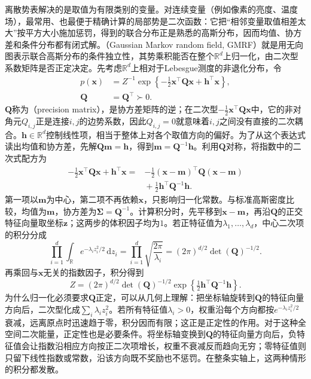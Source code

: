 离散势表解决的是取值为有限类别的变量。对连续变量（例如像素的亮度、温度场），最常用、也最便于精确计算的局部势是二次函数：它把“相邻变量取值相差太大”按平方大小施加惩罚，得到的联合分布正是熟悉的高斯分布，因而均值、协方差和条件分布都有闭式解。（Gaussian Markov random field, GMRF）就是用无向图表示联合高斯分布的条件独立性，其势乘积能否在整个$\mathbb{R}^d$上归一化，由二次型系数矩阵是否正定决定。先考虑$\mathbb{R}^d$上相对于Lebesgue测度的非退化分布，令
\begin{equation}
  \begin{aligned}
    p(\bm{x})&=Z^{-1}
      \exp\left\{-\tfrac12\bm{x}^{\top}\bm{Q}\bm{x}
                   +\bm{h}^{\top}\bm{x}\right\},\\
    \bm{Q}&=\bm{Q}^{\top}\succ0.
  \end{aligned}
  \label{eq:pgm-undirected-gaussian}
\end{equation}
$\bm{Q}$称为（precision matrix），是协方差矩阵的逆；在二次型$-\tfrac12\bm{x}^{\top}\bm{Q}\bm{x}$中，它的非对角元$Q_{i,j}$正是连接$i,j$的边势系数，因此$Q_{i,j}=0$就意味着$i,j$之间没有直接的二次耦合。$\bm{h}\in\mathbb{R}^d$控制线性项，相当于整体上对各个取值方向的偏好。为了从这个表达式读出均值和协方差，先解$\bm{Q}\bm{m}=\bm{h}$，得到$\bm{m}=\bm{Q}^{-1}\bm{h}$。利用$\bm{Q}$对称，将指数中的二次式配方为
\[
  \begin{aligned}
    -\tfrac12\bm{x}^{\top}\bm{Q}\bm{x}
      +\bm{h}^{\top}\bm{x}
    ={}&-\tfrac12(\bm{x}-\bm{m})^{\top}
               \bm{Q}(\bm{x}-\bm{m})\\
       &{}+\tfrac12\bm{h}^{\top}\bm{Q}^{-1}\bm{h}.
  \end{aligned}
\]
第一项以$\bm{m}$为中心，第二项不再依赖$\bm{x}$，只影响归一化常数。与标准高斯密度比较，均值为$\bm{m}$，协方差为$\bm{\Sigma}=\bm{Q}^{-1}$。计算积分时，先平移到$\bm{x}-\bm{m}$，再沿$\bm{Q}$的正交特征向量取坐标$\bm{z}$；这两步的体积因子均为$1$。若正特征值为$\lambda_1,\ldots,\lambda_d$，中心二次项的积分分成
\[
  \prod_{i=1}^d\int_{\mathbb{R}}
       e^{-\lambda_i z_i^2/2}\,\mathrm{d}z_i
  =\prod_{i=1}^d\sqrt{\frac{2\pi}{\lambda_i}}
  =(2\pi)^{d/2}\det(\bm{Q})^{-1/2}.
\]
再乘回与$\bm{x}$无关的指数因子，积分得到
\begin{equation}
  Z=(2\pi)^{d/2}\det(\bm{Q})^{-1/2}
     \exp\left\{\tfrac12\bm{h}^{\top}\bm{Q}^{-1}\bm{h}\right\}.
  \label{eq:pgm-undirected-gaussian-partition}
\end{equation}
为什么归一化必须要求$\bm{Q}$正定，可以从几何上理解：把坐标轴旋转到$\bm{Q}$的特征向量方向后，二次型化成$\sum_i\lambda_i z_i^2$。若所有特征值$\lambda_i>0$，权重沿每个方向都按$e^{-\lambda_i z_i^2/2}$衰减，远离原点时迅速趋于零，积分因而有限；这正是正定性的作用。对于这种全空间二次能量，正定性也是必要条件。将坐标轴变换到$\bm{Q}$的特征向量方向后，负特征值会让指数沿相应方向按正二次项增长，权重不衰减反而趋向无穷；零特征值则只留下线性指数或常数，沿该方向既不奖励也不惩罚。在整条实轴上，这两种情形的积分都发散。

